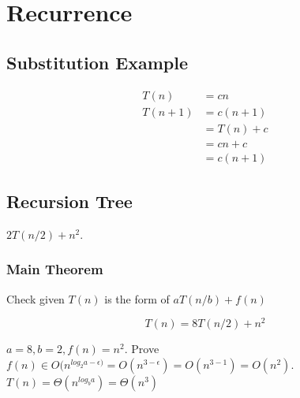 \documentclass{article}
\begin{document}
\setcounter{section}{3}
\section{Recurrence}
\subsection*{Substitution Example}
\begin{align}
T(n) &= cn \\
T(n+1) &= c(n + 1) \\
&= T(n) + c \\
&= cn + c \\
&= c(n + 1)
\end{align}

\subsection*{Recursion Tree}
$2T(n/2) + n^2$.


\subsubsection*{Main Theorem}
Check given $T(n)$ is the form of $aT(n/b) + f(n)$

\begin{equation}
T(n) = 8 T (n/2) + n^2
\end{equation}

$a = 8, b = 2, f(n) = n^2$. Prove $f(n) \in O(n^{log _2 a- \epsilon)} = O(n^{3- \epsilon}) = O(n^{3 - 1}) = O(n^2)$. $T(n) = \Theta (n^{log _b a}) = \Theta (n^3)$
\end{document}
